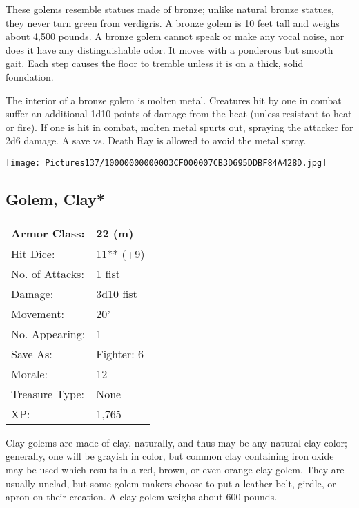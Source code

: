 \documentclass[a4paper,twoside,openany,10pt]{book}
\begin{document}
\begin{multicols}{2}
These golems resemble statues made of bronze; unlike natural bronze statues, they never turn green from verdigris. A bronze golem is 10 feet tall and weighs about 4,500 pounds. A bronze golem cannot speak or make any vocal noise, nor does it have any distinguishable odor. It moves with a ponderous but smooth gait. Each step causes the floor to tremble unless it is on a thick, solid foundation.

The interior of a bronze golem is molten metal. Creatures hit by one in combat suffer an additional 1d10 points of damage from the heat (unless resistant to heat or fire). If one is hit in combat, molten metal spurts out, spraying the attacker for 2d6 damage. A save vs. Death Ray is allowed to avoid the metal spray.

\begin{center}
	\texttt{[image: Pictures137/10000000000003CF000007CB3D695DDBF84A428D.jpg]}
\end{center}

\subsection*{Golem, Clay*}\label{golem-clay}

\begin{tabularx}{0.48\textwidth}{@{}lX@{}}
Armor Class: & 22 (m) \\\hline
Hit Dice: & 11** (+9) \\\hline
No. of Attacks: & 1 fist \\\hline
Damage: & 3d10 fist \\\hline
Movement: & 20' \\\hline
No. Appearing: & 1 \\\hline
Save As: & Fighter: 6 \\\hline
Morale: & 12 \\\hline
Treasure Type: & None \\\hline
XP: & 1,765 \\\hline
\end{tabularx}\medskip

Clay golems are made of clay, naturally, and thus may be any natural clay color; generally, one will be grayish in color, but common clay containing iron oxide may be used which results in a red, brown, or even orange clay golem. They are usually unclad, but some golem-makers choose to put a leather belt, girdle, or apron on their creation. A clay golem weighs about 600 pounds.


\end{multicols}
\end{document}
